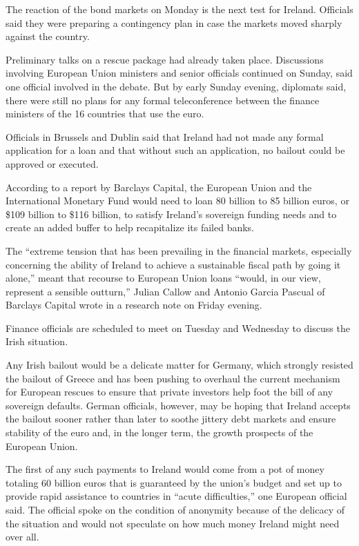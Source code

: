 ﻿\documentclass[12pt]{article}
\begin{document}
The reaction of the bond markets on Monday is the next test for Ireland. Officials said they were
preparing a contingency plan in case the markets moved sharply against the country.

Preliminary talks on a rescue package had already taken place. Discussions involving European Union
ministers and senior officials continued on Sunday, said one official involved in the debate. But by
early Sunday evening, diplomats said, there were still no plans for any formal teleconference
between the finance ministers of the 16 countries that use the euro.

Officials in Brussels and Dublin said that Ireland had not made any formal application for a loan
and that without such an application, no bailout could be approved or executed.

According to a report by Barclays Capital, the European Union and the International Monetary Fund
would need to loan 80 billion to 85 billion euros, or \$109 billion to \$116 billion, to satisfy
Ireland's sovereign funding needs and to create an added buffer to help recapitalize its failed
banks.

The ``extreme tension that has been prevailing in the financial markets, especially concerning the
ability of Ireland to achieve a sustainable fiscal path by going it alone,'' meant that recourse to
European Union loans ``would, in our view, represent a sensible outturn,'' Julian Callow and Antonio
Garcia Pascual of Barclays Capital wrote in a research note on Friday evening.

Finance officials are scheduled to meet on Tuesday and Wednesday to discuss the Irish situation.

Any Irish bailout would be a delicate matter for Germany, which strongly resisted the bailout of
Greece and has been pushing to overhaul the current mechanism for European rescues to ensure that
private investors help foot the bill of any sovereign defaults. German officials, however, may be
hoping that Ireland accepts the bailout sooner rather than later to soothe jittery debt markets and
ensure stability of the euro and, in the longer term, the growth prospects of the European Union.

The first of any such payments to Ireland would come from a pot of money totaling 60 billion euros
that is guaranteed by the union's budget and set up to provide rapid assistance to countries in
``acute difficulties,'' one European official said. The official spoke on the condition of anonymity
because of the delicacy of the situation and would not speculate on how much money Ireland might
need over all.
\end{document}
